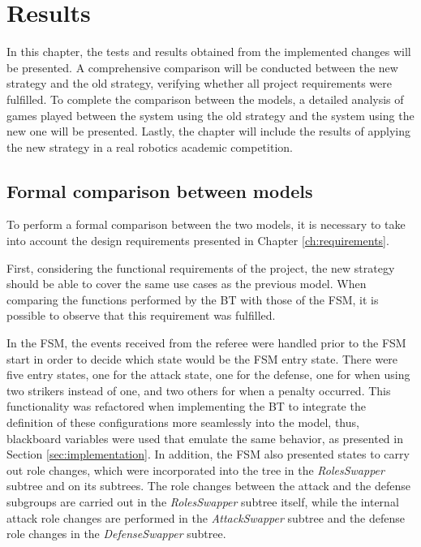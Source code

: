 \chapter{Results}
\label{ch:results}

In this chapter, the tests and results obtained from the implemented changes will be presented. A comprehensive comparison will be conducted between the new strategy and the old strategy, verifying whether all project requirements were fulfilled. To complete the comparison between the models, a detailed analysis of games played between the system using the old strategy and the system using the new one will be presented. Lastly, the chapter will include the results of applying the new strategy in a real robotics academic competition.

\section{Formal comparison between models}

To perform a formal comparison between the two models, it is necessary to take into account the design requirements presented in Chapter \ref{ch:requirements}.

First, considering the functional requirements of the project, the new strategy should be able to cover the same use cases as the previous model. When comparing the functions performed by the BT with those of the FSM, it is possible to observe that this requirement was fulfilled. 

In the FSM, the events received from the referee were handled prior to the FSM start in order to decide which state would be the FSM entry state. There were five entry states, one for the attack state, one for the defense, one for when using two strikers instead of one, and two others for when a penalty occurred. This functionality was refactored when implementing the BT to integrate the definition of these configurations more seamlessly into the model, thus, blackboard variables were used that emulate the same behavior, as presented in Section \ref{sec:implementation}. In addition, the FSM also presented states to carry out role changes, which were incorporated into the tree in the \textit{RolesSwapper} subtree and on its subtrees. The role changes between the attack and the defense subgroups are carried out in the \textit{RolesSwapper} subtree itself, while the internal attack role changes are performed in the \textit{AttackSwapper} subtree and the defense role changes in the \textit{DefenseSwapper} subtree.

